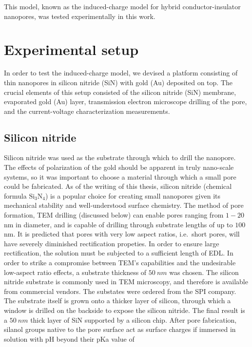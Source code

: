 		This model, known as the induced-charge model for hybrid conductor-insulator nanopores, was tested experimentally in this work.
		
	\section{Experimental setup}
		
		In order to test the induced-charge model, we devised a platform consisting of thin nanopores in silicon nitride (SiN) with gold (Au) deposited on top. The crucial elements of this setup consisted of the silicon nitride (SiN) membrane, evaporated gold (Au) layer, transmission electron microscope drilling of the pore, and the current-voltage characterization measurements.
		
		\subsection{Silicon nitride}
			
			Silicon nitride was used as the substrate through which to drill the nanopore. The effects of polarization of the gold should be apparent in truly nano-scale systems, so it was important to choose a material through which a small pore could be fabricated. As of the writing of this thesis, silicon nitride (chemical formula $\mathrm{Si_{3}N_{4}}$) is a popular choice for creating small nanopores given its mechanical stability and well-understood surface chemistry. The method of pore formation, TEM drilling (discussed below) can enable pores ranging from $1-20$ nm in diameter, and is capable of drilling through substrate lengths of up to $100$ nm. It is predicted that pores with very low aspect ratios, i.e.~short pores, will have severely diminished rectification propeties. In order to ensure large rectification, the solution must be subjected to a sufficient length of EDL. In order to strike a compromise between TEM's capabilities and the undesirable low-aspect ratio effects, a substrate thickness of $\SI{50}{nm}$ was chosen. The silicon nitride substrate is commonly used in TEM microscopy, and therefore is available from commercial vendors. The substates were ordered from the SPI company. The substrate itself is grown onto a thicker layer of silicon, through which a window is drilled on the backside to expose the silicon nitride. The final result is a $\SI{50}{nm}$ thick layer of SiN supported by a silicon chip. After pore fabrication, silanol groups native to the pore surface act as surface charges if immersed in solution with pH beyond their pKa value of 
			
